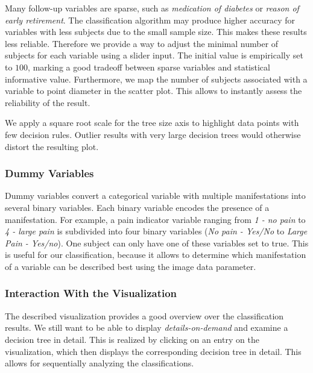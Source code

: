 \documentclass[a4paper,twoside]{style/article}
\newcommand{\com}[1]{\textcolor{orange}{\uline{#1}}}
\begin{document}
Many follow-up variables are sparse, such as \emph{medication of diabetes} or \emph{reason of early retirement}.
The classification algorithm may produce higher accuracy for variables with less subjects due to the small sample size.
This makes these results less reliable.
Therefore we provide a way to adjust the minimal number of subjects for each variable using a slider input.
The initial value is empirically set to $100$, marking a good tradeoff between sparse variables and statistical informative value.
Furthermore, we map the number of subjects associated with a variable to point diameter in the scatter plot.
This allows to instantly assess the reliability of the result.

We apply a square root scale for the tree size axis to highlight data points with few decision rules.
Outlier results with very large decision trees would otherwise distort the resulting plot.

%
\subsubsection{Dummy Variables}
Dummy variables convert a categorical variable with multiple manifestations into several binary variables.
Each binary variable encodes the presence of a manifestation.
For example, a pain indicator variable ranging from \emph{1 - no pain} to \emph{4 - large pain} is subdivided into four binary variables (\emph{No pain - Yes/No} to \emph{Large Pain - Yes/no}).
One subject can only have one of these variables set to true.
This is useful for our classification, because it allows to determine which manifestation of a variable can be described best using the image data parameter.
\subsubsection{Interaction With the Visualization}
The described visualization provides a good overview over the classification results.
We still want to be able to display \emph{details-on-demand} \cite{shneiderman1996} and examine a decision tree in detail.
This is realized by clicking on an entry on the visualization, which then displays the corresponding decision tree in detail.
This allows for sequentially analyzing the classifications.
\end{document}
